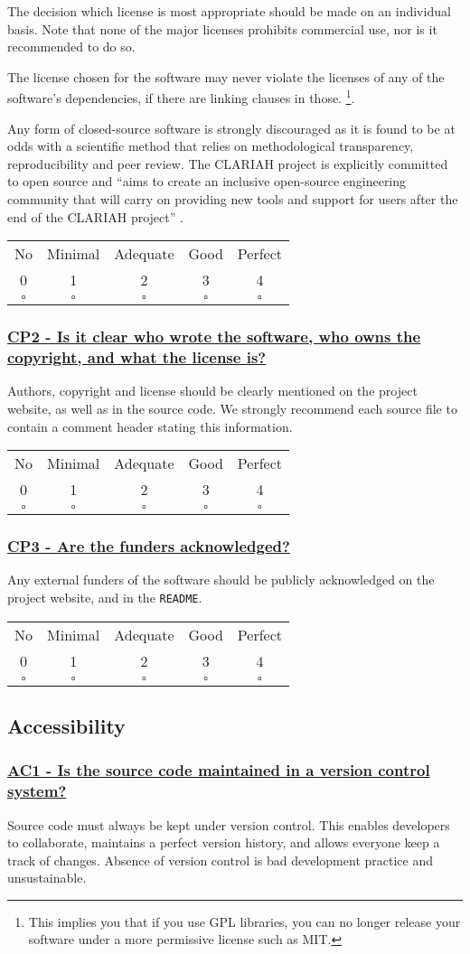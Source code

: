 \documentclass[a4paper,11pt]{article}
\newcommand{\criterion}[2]{\subsubsection*{\underline{#1 - #2}}\label{id:#1}}
\newcommand\CheckTable{%
  \begin{tabular}{ccccc}
    No & Minimal & Adequate & Good & Perfect \\
    0 & 1 & 2 & 3 & 4 \\
    \hline
    $\square$ & $\square$ & $\square$ & $\square$ & $\square$ \\
  \end{tabular}%
}
\begin{document}
The decision which license is most appropriate should be made on an individual
basis. Note that none of the major licenses prohibits commercial use, nor is it
recommended to do so.

The license chosen for the software may never violate the licenses of any of
the software's dependencies, if there are linking clauses in those. \footnote{This implies you that if you use GPL libraries, you can no longer release your software under a more permissive license such as MIT.}.

Any form of closed-source software is strongly discouraged as it is found to be
at odds with a scientific method that relies on methodological transparency,
reproducibility and peer review. The CLARIAH project is explicitly committed to
open source and ``aims to create an inclusive open-source engineering community
that will carry on providing new tools and support for users after the end of
the CLARIAH project'' \citep{CLARIAHTECHPLAN1}.

\CheckTable

\newcommand{\cpTwoID}{CP2}
\newcommand{\cpTwoText}{Is it clear who wrote the software, who owns the copyright, and what the license is?}
\criterion{\cpTwoID}{\cpTwoText}

Authors, copyright and license should be clearly mentioned on the project
website, as well as in the source code.  We strongly recommend each source file to contain a comment header stating this information.

\CheckTable

\newcommand{\cpThreeID}{CP3}
\newcommand{\cpThreeText}{Are the funders acknowledged?}
\criterion{\cpThreeID}{\cpThreeText}

Any external funders of the software should be publicly acknowledged on the project
website, and in the \texttt{README}.

\CheckTable

\subsection{Accessibility}\label{sec:acc}

\newcommand{\acOneID}{AC1}
\newcommand{\acOneText}{Is the source code maintained in a version control system?}
\criterion{\acOneID}{\acOneText}

Source code must always be kept under version control. This enables developers
to collaborate, maintains a perfect version history, and allows everyone keep a
track of changes. Absence of version control is bad development practice and
unsustainable.
\end{document}
